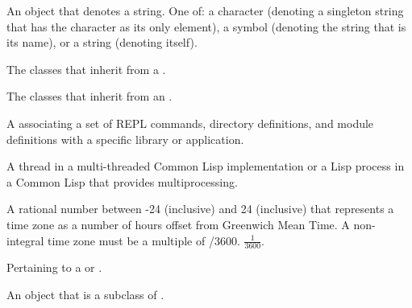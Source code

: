 \begin{glossary-list}

%
%
An object that denotes a string. One of: a character (denoting a
singleton string that has the character as its only element), a symbol
(denoting the string that is its name), or a string (denoting itself).


\glent[subclasses]
%
%
%
The classes that inherit from a .


\glent[subevents]
%
%
The classes that inherit from an .


%
%
A  associating a set of REPL commands, directory
definitions, and module definitions with a specific library or application.


\glent[thread] 
%
%
%
A thread in a multi-threaded Common Lisp implementation or a Lisp process in a
Common Lisp that provides multiprocessing.


%
%
A rational number between -24 (inclusive) and 24 (inclusive) that represents a
time zone as a number of hours offset from Greenwich Mean Time. A non-integral
time zone must be a multiple of 
%
/3600.  
\T$\frac{1}{3600}$.


\glent[unit]
%
%
%
%
%
Pertaining to a  or .


%
%
%
%
%
%
%
An object that is a subclass of .


\end{glossary-list}
